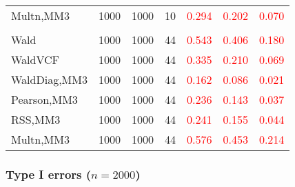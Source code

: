 \documentclass[
]{article}
\begin{document}
\begin{table}[H]
{\begin{tabular}[t]{lrrrrrr}
\hspace{1em}Multn,MM3 & 1000 & 1000 & 10 & \textcolor{red}{0.294} & \textcolor{red}{0.202} & \textcolor{red}{0.070}\\
\addlinespace[0.3em]
\multicolumn{7}{l}{\textbf{3F 15V}}\\
\hspace{1em}Wald & 1000 & 1000 & 44 & \textcolor{red}{0.543} & \textcolor{red}{0.406} & \textcolor{red}{0.180}\\
\hspace{1em}WaldVCF & 1000 & 1000 & 44 & \textcolor{red}{0.335} & \textcolor{red}{0.210} & \textcolor{red}{0.069}\\
\hspace{1em}WaldDiag,MM3 & 1000 & 1000 & 44 & \textcolor{red}{0.162} & \textcolor{red}{0.086} & \textcolor{red}{0.021}\\
\hspace{1em}Pearson,MM3 & 1000 & 1000 & 44 & \textcolor{red}{0.236} & \textcolor{red}{0.143} & \textcolor{red}{0.037}\\
\hspace{1em}RSS,MM3 & 1000 & 1000 & 44 & \textcolor{red}{0.241} & \textcolor{red}{0.155} & \textcolor{red}{0.044}\\
\hspace{1em}Multn,MM3 & 1000 & 1000 & 44 & \textcolor{red}{0.576} & \textcolor{red}{0.453} & \textcolor{red}{0.214}\\
\bottomrule
\end{tabular}}
\endgroup{}
\end{table}

\hypertarget{type-i-errors-n2000-1}{%
\subsubsection{\texorpdfstring{Type I errors
(\(n=2000\))}{Type I errors (n=2000)}}\label{type-i-errors-n2000-1}}
\end{document}
